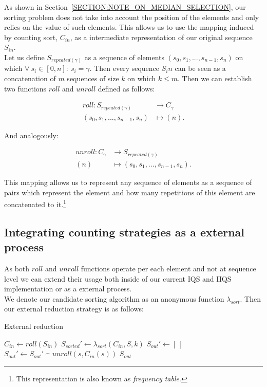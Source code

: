 As shown in Section~\ref{SECTION:NOTE_ON_MEDIAN_SELECTION}, our sorting problem does not take into account the position of the elements and only relies on the value of such elements. This allows us to use the mapping induced by counting sort, $C_{in}$, as a intermediate representation of our original sequence $S_{in}$.\\

Let us define $S_{repeated(\gamma)}$ as a sequence of elements $(s_0, s_1,...,s_{n-1},s_{n})$ on which $\forall ~s_i \in [0,n]:~s_i = \gamma$. Then every sequence $S_in$ can be seen as a concatenation of $m$ sequences of size $k$ on which $k \leq m$. Then we can establish two functions $roll$ and $unroll$ defined as follows:

\begin{align*}
    roll \colon S_{repeated(\gamma)} &\to C_{\gamma}\\
    (s_0, s_1,...,s_{n-1},s_{n})  &\mapsto (n).
\end{align*}

And analogously:

\begin{align*}
    unroll \colon C_{\gamma} &\to S_{repeated(\gamma)}\\
    (n) &\mapsto (s_0, s_1,...,s_{n-1},s_{n}).
\end{align*}

This mapping allows us to represent any sequence of elements as a sequence of pairs which represent the element and how many repetitions of this element are concatenated to it.\footnote{This representation is also known as \emph{frequency table}.}\\

\subsection{Integrating counting strategies as a external process}
As both $roll$ and $unroll$ functions operate per each element and not at sequence level we can extend their usage both inside of our current IQS and IIQS implementation or as a external process.\\

We denote our candidate sorting algorithm as an anonymous function $\lambda_{sort}$. Then our external reduction strategy is as follows:


\begin{algorithm}
\caption{External reduction}\label{ALG:EXTERNAL_IQS}
\begin{algorithmic}[1]
    \State $C_{in} \gets roll(S_{in})$
    \State $S_{sorted}' \gets \lambda_{sort}(C_{in}, S, k)$
    \State $S_{out}' \gets [~]$
        \State $S_{out}' \gets S_{out}'~^\frown~unroll(s, C_{in}(s))$
    \EndFor
    \State \Return $S_{out}$
    \EndProcedure
\end{algorithmic}
\end{algorithm}

